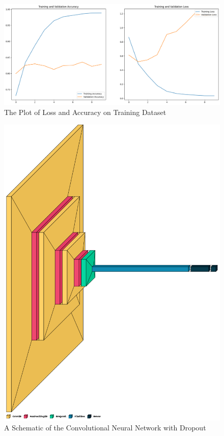 \documentclass[11pt,a4paper]{article}
\begin{document}
 \begin{figure}[h!]
 \centering
  \includegraphics[width=\linewidth]{training_valid_plot.png}
  \caption{The Plot of Loss and Accuracy on Training Dataset}
  \label{cnn_loss}
\end{figure}

 \begin{figure}[h!]
 \centering
  \includegraphics[width=0.85\linewidth]{dropout_schema.png}
  \caption{A Schematic of the Convolutional Neural Network with Dropout}
  \label{dropout_schema}
\end{figure}
\end{document}
